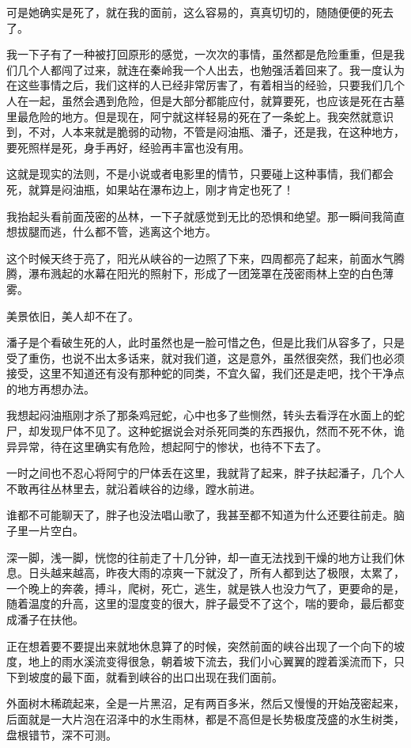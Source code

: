 可是她确实是死了，就在我的面前，这么容易的，真真切切的，随随便便的死去了。

我一下子有了一种被打回原形的感觉，一次次的事情，虽然都是危险重重，但是我们几个人都闯了过来，就连在秦岭我一个人出去，也勉强活着回来了。我一度认为在这些事情之后，我们这样的人已经非常厉害了，有着相当的经验，只要我们几个人在一起，虽然会遇到危险，但是大部分都能应付，就算要死，也应该是死在古墓里最危险的地方。但是现在，阿宁就这样轻易的死在了一条蛇上。我突然就意识到，不对，人本来就是脆弱的动物，不管是闷油瓶、潘子，还是我，在这种地方，要死照样是死，身手再好，经验再丰富也没有用。

这就是现实的法则，不是小说或者电影里的情节，只要碰上这种事情，我们都会死，就算是闷油瓶，如果站在瀑布边上，刚才肯定也死了！

我抬起头看前面茂密的丛林，一下子就感觉到无比的恐惧和绝望。那一瞬间我简直想拔腿而逃，什么都不管，逃离这个地方。

这个时候天终于亮了，阳光从峡谷的一边照了下来，四周都亮了起来，前面水气腾腾，瀑布溅起的水幕在阳光的照射下，形成了一团笼罩在茂密雨林上空的白色薄雾。

美景依旧，美人却不在了。

潘子是个看破生死的人，此时虽然也是一脸可惜之色，但是比我们从容多了，只是受了重伤，也说不出太多话来，就对我们道，这是意外，虽然很突然，我们也必须接受，这里不知道还有没有那种蛇的同类，不宜久留，我们还是走吧，找个干净点的地方再想办法。

我想起闷油瓶刚才杀了那条鸡冠蛇，心中也多了些恻然，转头去看浮在水面上的蛇尸，却发现尸体不见了。这种蛇据说会对杀死同类的东西报仇，然而不死不休，诡异异常，待在这里确实有危险，想起阿宁的惨状，也待不下去了。

一时之间也不忍心将阿宁的尸体丢在这里，我就背了起来，胖子扶起潘子，几个人不敢再往丛林里去，就沿着峡谷的边缘，蹚水前进。

谁都不可能聊天了，胖子也没法唱山歌了，我甚至都不知道为什么还要往前走。脑子里一片空白。

深一脚，浅一脚，恍惚的往前走了十几分钟，却一直无法找到干燥的地方让我们休息。日头越来越高，昨夜大雨的凉爽一下就没了，所有人都到达了极限，太累了，一个晚上的奔袭，搏斗，爬树，死亡，逃生，就是铁人也没力气了，更要命的是，随着温度的升高，这里的湿度变的很大，胖子最受不了这个，喘的要命，最后都变成潘子在扶他。

正在想着要不要提出来就地休息算了的时候，突然前面的峡谷出现了一个向下的坡度，地上的雨水溪流变得很急，朝着坡下流去，我们小心翼翼的蹚着溪流而下，只下到坡度的最下面，就看到峡谷的出口出现在我们面前。

外面树木稀疏起来，全是一片黑沼，足有两百多米，然后又慢慢的开始茂密起来，后面就是一大片泡在沼泽中的水生雨林，都是不高但是长势极度茂盛的水生树类，盘根错节，深不可测。

